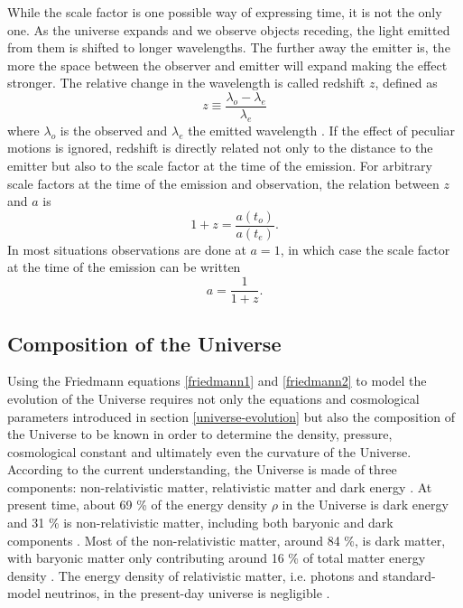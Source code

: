 \documentclass[english, oneside]{HYgradu}
\begin{document}
While the scale factor is one possible way of expressing time, it is not the only one. As the universe expands and we observe objects receding, the light emitted from them is shifted to longer wavelengths. The further away the emitter is, the more the space between the observer and emitter will expand making the effect stronger. The relative change in the wavelength is called redshift $z$, defined as
\begin{equation}
z \equiv \frac{\lambda_o - \lambda_e}{\lambda_e}
\end{equation}
where $\lambda_o$ is the observed and $\lambda_e$ the emitted wavelength \citep{mo2010galaxy}. If the effect of peculiar motions is ignored, redshift is directly related not only to the distance to the emitter but also to the scale factor at the time of the emission. For arbitrary scale factors at the time of the emission and observation, the relation between $z$ and $a$ is \citep{mo2010galaxy}
\begin{equation}
1 + z = \frac{a(t_o)}{a(t_e)}.
\end{equation}
In most situations observations are done at $a=1$, in which case the scale factor at the time of the emission can be written
\begin{equation}
a = \frac{1}{1+z}.
\end{equation}


\subsection{Composition of the Universe} \label{universe-composition}
Using the Friedmann equations \ref{friedmann1} and \ref{friedmann2} to model the evolution of the Universe requires not only the equations and cosmological parameters introduced in section \ref{universe-evolution} but also the composition of the Universe to be known in order to determine the density, pressure, cosmological constant and ultimately even the curvature of the Universe. According to the current understanding, the Universe is made of three components: non-relativistic matter, relativistic matter and dark energy \citep{mo2010galaxy}. At present time, about 69 \% of the energy density $\rho$ in the Universe is dark energy and 31 \% is non-relativistic matter, including both baryonic and dark components \citep{planck2016resultsI}. Most of the non-relativistic matter, around 84 \%, is dark matter, with baryonic matter only contributing around 16 \% of total matter energy density \citep{planck2016resultsI}. The energy density of relativistic matter, i.e. photons and standard-model neutrinos, in the present-day universe is negligible \citep{mo2010galaxy}.
\end{document}
